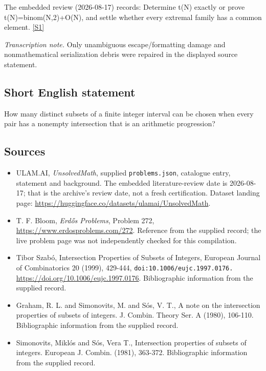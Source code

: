 \documentclass[11pt,a4paper]{article}
\newcommand{\sref}[2]{\hyperlink{source:#1:#2}{[S#2]}}
\begin{document}
The embedded review (2026-08-17) records: Determine t(N) exactly or prove t(N)=binom(N,2)+O(N), and settle whether every extremal family has a common element. \sref{statement}{1}

{\small\emph{Transcription note.} Only unambiguous escape/formatting damage and nonmathematical serialization debris were repaired in the displayed source statement.}

\subsection{Short English statement}

How many distinct subsets of a finite integer interval can be chosen when every pair has a nonempty intersection that is an arithmetic progression?

\subsection{Sources}

{\small

\begin{itemize}

\item[\hypertarget{source:statement:1}{S1}] ULAM.AI, \emph{UnsolvedMath}, supplied \texttt{problems.json}, catalogue entry, statement and background. The embedded literature-review date is 2026-08-17; that is the archive’s review date, not a fresh certification. Dataset landing page: \url{https://huggingface.co/datasets/ulamai/UnsolvedMath}.

\item[\hypertarget{source:statement:2}{S2}] T. F. Bloom, \emph{Erdős Problems}, Problem 272, \url{https://www.erdosproblems.com/272}. Reference from the supplied record; the live problem page was not independently checked for this compilation.

\item[\hypertarget{source:statement:3}{S3}] Tibor Szabó, Intersection Properties of Subsets of Integers, European Journal of Combinatorics 20 (1999), 429-444, \nolinkurl{doi:10.1006/eujc.1997.0176.} \url{https://doi.org/10.1006/eujc.1997.0176}. Bibliographic information from the supplied record.

\item[\hypertarget{source:statement:4}{S4}] Graham, R. L. and Simonovits, M. and S\'{o}s, V. T., A note on the intersection properties of subsets of integers. J. Combin. Theory Ser. A (1980), 106-110. Bibliographic information from the supplied record.

\item[\hypertarget{source:statement:5}{S5}] Simonovits, Mikl\'{o}s and S\'{o}s, Vera T., Intersection properties of subsets of integers. European J. Combin. (1981), 363-372. Bibliographic information from the supplied record.

\end{itemize}

}

\label{end:statement}
\end{document}
